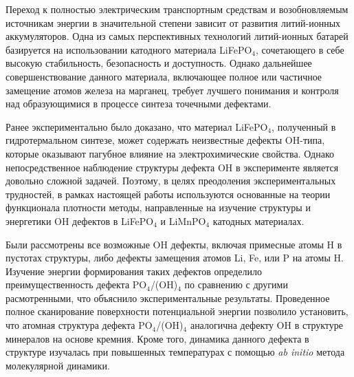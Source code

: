 

Переход к полностью электрическим транспортным средствам и возобновляемым источникам энергии в значительной степени зависит от развития литий-ионных аккумуляторов. Одна из самых перспективных технологий литий-ионных батарей базируется на использовании катодного материала LiFePO$_4$, сочетающего в себе высокую стабильность, безопасность и доступность. Однако дальнейшее совершенствование данного материала, включающее полное или частичное замещение атомов железа на марганец, требует лучшего понимания и контроля над образующимися в процессе синтеза точечными дефектами. 

Ранее экспериментально было доказано, что материал LiFePO$_4$, полученный в гидро\-термальном синтезе, может содержать неизвестные дефекты OH-типа, которые оказывают пагубное влияние на электрохимические свойства. Однако непосредственное наблюдение структуры дефекта OH в эксперименте является довольно сложной задачей. Поэтому, в целях преодоления экспериментальных трудностей, в рамках настоящей работы используются основанные на теории функционала плотности методы, направленные на изучение структуры и энергетики OH дефектов в LiFePO$_4$ и LiMnPO$_4$ катодных материалах.

Были рассмотрены все возможные OH дефекты, включая примесные атомы H в пустотах структуры, либо дефекты замещения атомов Li, Fe, или P на атомы H. Изучение энергии формирования таких дефектов определило преимущественность дефекта PO$_4$/(OH)$_4$ по сравне\-нию с другими расмотренными, что объяснило экспериментальные результаты. Проведенное полное сканирование поверхности потенциальной энергии позволило установить, что атомная структура дефекта PO$_4$/(OH)$_4$ аналогична дефекту OH в структуре минералов на основе крем\-ния. Кроме того, динамика данного дефекта в структуре изучалась при повышенных температурах с помощью \textit{ab initio} метода молекулярной динамики.

